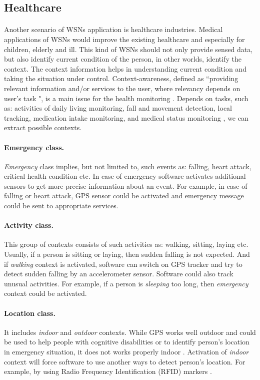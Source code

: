 \documentclass[12pt,a4paper]{article}
\begin{document}
\subsection{Healthcare}\label{healthcare}
\paragraph{}
Another scenario of WSNs application is healthcare industries. Medical applications of WSNs would improve the existing healthcare and especially for children, elderly and ill. This kind of WSNs should not only provide sensed data, but also identify current condition of the person, in other worlds, identify the context. The context information helps in understanding current condition and taking the situation under control.
Context-awareness, defined as ``providing relevant information and/or services to the user, where relevancy depends on user's task \cite{dey99-1}", is a main issue for the health monitoring \cite{ng04}. Depends on tasks, such as: activities of daily living monitoring, fall and movement detection, local tracking, medication intake monitoring, and medical status monitoring \cite{alemdar10}, we can extract possible contexts.

\paragraph{Emergency class.} \textit{Emergency} class implies, but not limited to, such events as: falling, heart attack, critical health condition etc. In case of emergency software activates additional sensors to get more precise information about an event. For example, in case of falling or heart attack, GPS sensor could be activated and emergency message could be sent to appropriate services.

\paragraph{Activity class.} This group of contexts consists of such activities as: walking, sitting, laying etc. Usually, if a person is sitting or laying, then sudden falling is not expected. And if \textit{walking} context is activated, software can switch on GPS tracker and try to detect sudden falling by an accelerometer sensor. Software could also track unusual activities. For example, if a person is \textit{sleeping} too long, then \textit{emergency} context could be activated. 

\paragraph{Location class.} It includes \textit{indoor} and \textit{outdoor} contexts. While GPS works well outdoor and could be used to help people with cognitive disabilities or to identify person's location in emergency situation, it does not works properly indoor \cite{alemdar10}. Activation of \textit{indoor} context will force software to use another ways to detect person's location. For example, by using Radio Frequency Identification (RFID) markers \cite{chang08}.
\end{document}
